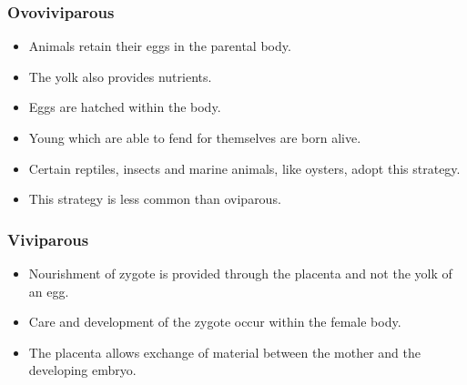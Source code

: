 \documentclass[11pt]{article}
\begin{document}
\subsubsection{Ovoviviparous}
\label{sec:org7f38f88}
\begin{itemize}
\item Animals retain their eggs in the parental body.
\item The yolk also provides nutrients.
\item Eggs are hatched within the body.
\item Young which are able to fend for themselves are born alive.
\item Certain reptiles, insects and marine animals, like oysters, adopt this strategy.
\item This strategy is less common than oviparous.
\end{itemize}

\subsubsection{Viviparous}
\label{sec:orgeeb0d72}
\begin{itemize}
\item Nourishment of zygote is provided through the placenta and not the yolk of an egg.
\item Care and development of the zygote occur within the female body.
\item The placenta allows exchange of material between the mother and the developing embryo.
\end{itemize}
\end{document}
